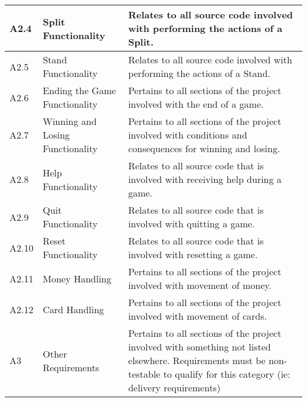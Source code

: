 \documentclass{article}
\newcounter{Requirement}
\begin{document}
\begin{tabular}{|l|l|p{3.5in}|}
A2.4&Split Functionality& Relates to all source code involved with performing the actions of a Split. \\\hline 
A2.5&Stand Functionality& Relates to all source code involved with performing the actions of a Stand. \\\hline
A2.6&Ending the Game Functionality& Pertains to all sections of the project involved with the end of a game.\\\hline
A2.7& Winning and Losing Functionality& Pertains to all sections of the project involved with conditions and consequences for winning and losing.\\\hline
A2.8&Help Functionality&Relates to all source code that is involved with receiving help during a game. \\\hline 
A2.9&Quit Functionality& Relates to all source code that is involved with quitting a game.\\\hline 
A2.10&Reset Functionality& Relates to all source code that is involved with resetting a game. \\\hline 
A2.11&Money Handling & Pertains to all sections of the project involved with movement of money.\\\hline
A2.12& Card Handling & Pertains to all sections of the project involved with movement of cards.\\\hline
A3& Other Requirements& Pertains to all sections of the project involved with something not listed elsewhere.  Requirements must be non-testable to qualify for this category (ie: delivery requirements)\\\hline
\end{tabular}
\newpage
\end{document}
